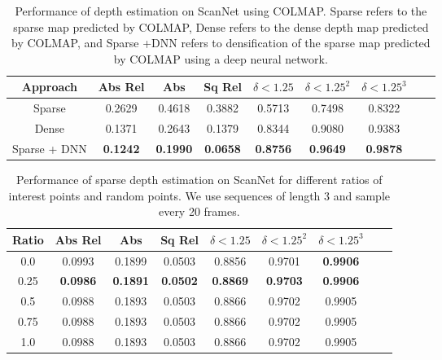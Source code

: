 \documentclass[runningheads]{llncs}
\begin{document}
\begin{table}[ht]
  \caption{Performance of depth estimation on ScanNet using COLMAP. Sparse refers to the sparse map predicted by COLMAP, Dense refers to the dense depth map predicted by COLMAP, and Sparse +DNN refers to densification of the sparse map predicted by COLMAP using a deep neural network. 
}
  \centering
\begin{tabular}{ccccccccc}
 \hline 
   Approach  &Abs Rel  &Abs & Sq Rel & \textbf{$\delta< 1.25$}& \textbf{$\delta < 1.25^2$}& \textbf{$\delta< 1.25^3$}\\
    \hline
Sparse &	0.2629 &	0.4618 &	0.3882 &	0.5713 &	0.7498 &	0.8322\\
\hline
Dense &	0.1371 & 0.2643 & 0.1379 & 0.8344 & 0.9080 & 0.9383  \\
Sparse + DNN  &	\textbf{0.1242} & \textbf{0.1990} & \textbf{0.0658}  &  \textbf{0.8756} & \textbf{0.9649} & \textbf{0.9878} \\

\hline
  \end{tabular}
\label{tablecolmap}
\end{table}

\begin{table}[ht]
  \caption{Performance of sparse depth estimation on ScanNet for different ratios of interest points and random points. We use sequences of length 3 and sample every 20 frames.
}
  \centering
\begin{tabular}{ccccccccc}
 \hline 
   Ratio  &Abs Rel  &Abs & Sq Rel & \textbf{$\delta< 1.25$}& \textbf{$\delta < 1.25^2$}& \textbf{$\delta< 1.25^3$}\\
    \hline
0.0 &	0.0993 &	0.1899 &	0.0503 &	0.8856 &	0.9701 &	\textbf{0.9906}\\
0.25 & \textbf{0.0986} &	\textbf{0.1891}&	\textbf{0.0502} &	\textbf{0.8869} &	\textbf{0.9703} &	\textbf{0.9906}\\
0.5 &	0.0988 & 0.1893 & 0.0503 &  0.8866 & 0.9702 & 0.9905 \\
0.75 &	0.0988 & 0.1893 & 0.0503  &  0.8866 & 0.9702 & 0.9905 \\
1.0 &	0.0988 & 0.1893 &0.0503  &  0.8866 & 0.9702 & 0.9905 \\
\hline
  \end{tabular}
\label{tablesparse}
\end{table}
\end{document}
